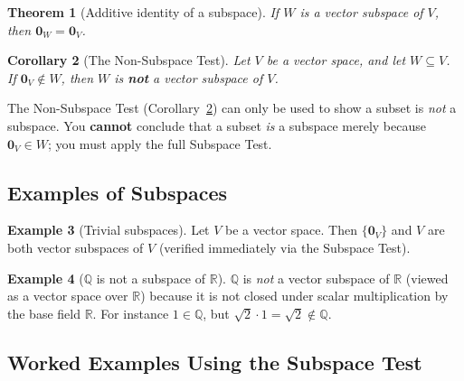 \documentclass[11pt, a4paper, notitlepage]{report}
\newtheorem{theorem}{Theorem}[section]
\newtheorem{corollary}[theorem]{Corollary}
\theoremstyle{definition}
\newtheorem{example}[theorem]{Example}
\theoremstyle{remark}
\begin{document}
\begin{theorem}[Additive identity of a subspace]\label{thm:subspace-zero}
If $W$ is a vector subspace of $V$, then $\mathbf{0}_W = \mathbf{0}_V$.
\end{theorem}

\begin{corollary}[The Non-Subspace Test]\label{cor:non-subspace}
Let $V$ be a vector space, and let $W \subseteq V$. If $\mathbf{0}_V \notin W$, then $W$ is \textbf{not} a vector subspace of $V$.
\end{corollary}

\begin{warning}[title={Warning: Non-Subspace Test is One-Directional}]
The Non-Subspace Test (Corollary~\ref{cor:non-subspace}) can only be used to show a subset is \emph{not} a subspace. You \textbf{cannot} conclude that a subset \emph{is} a subspace merely because $\mathbf{0}_V \in W$; you must apply the full Subspace Test.
\end{warning}

\subsection{Examples of Subspaces}

\begin{example}[Trivial subspaces]\label{ex:trivial-subspaces}
Let $V$ be a vector space. Then $\{\mathbf{0}_V\}$ and $V$ are both vector subspaces of $V$ (verified immediately via the Subspace Test).
\end{example}

\begin{example}[$\mathbb{Q}$ is not a subspace of $\mathbb{R}$]\label{ex:Q-not-sub-R}
$\mathbb{Q}$ is \emph{not} a vector subspace of $\mathbb{R}$ (viewed as a vector space over $\mathbb{R}$) because it is not closed under scalar multiplication by the base field $\mathbb{R}$. For instance $1 \in \mathbb{Q}$, but $\sqrt{2} \cdot 1 = \sqrt{2} \notin \mathbb{Q}$.
\end{example}

\subsection{Worked Examples Using the Subspace Test}
\end{document}

